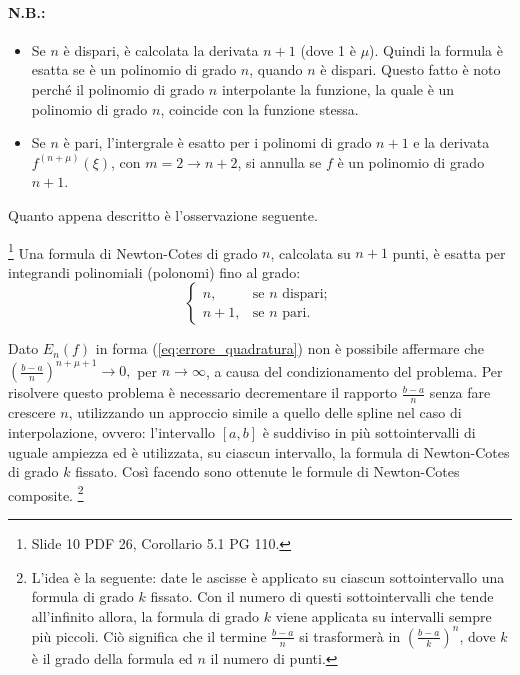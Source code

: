 

\paragraph{N.B.:}
\begin{itemize}
	\item Se $n$ è dispari, è calcolata la derivata $n+1$ (dove 1 è $\mu$). Quindi la formula è esatta se è un polinomio di grado $n$, quando $n$ è dispari. Questo fatto è noto perché il polinomio di grado $n$ interpolante la funzione, la quale è un polinomio di grado $n$, coincide con la funzione stessa.
	\item Se $n$ è pari, l'intergrale è esatto per i polinomi di grado $n+1$ e la derivata $f^{(n+\mu)}(\xi)$, con $m=2\rightarrow n+2$, si annulla se $f$ è un polinomio di grado $n+1$.
\end{itemize}
Quanto appena descritto è l'osservazione seguente.

\begin{remark}
    \footnote{Slide 10 PDF 26, Corollario 5.1 PG 110.} Una formula di Newton-Cotes di grado $n$, calcolata su $n+1$ punti, è esatta per integrandi polinomiali (polonomi) fino al grado:
    \begin{equation*}
        \begin{cases}
            n, &\text{se $n$ dispari};\\
            n+1, &\text{se $n$ pari}.
        \end{cases}
    \end{equation*}
\end{remark}

Dato $E_n(f)$ in forma (\ref{eq:errore_quadratura}) non è possibile affermare che $\left(\frac{b-a}{n}\right)^{n+\mu +1}\rightarrow 0,$ per $ n\rightarrow\infty$, a causa del condizionamento del problema. Per risolvere questo problema è necessario decrementare il rapporto $\frac{b-a}{n}$ senza fare crescere $n$, utilizzando un approccio simile a quello delle spline nel caso di interpolazione, ovvero: l'intervallo $[a,b]$ è suddiviso in più sottointervalli di uguale ampiezza ed è utilizzata, su ciascun intervallo, la formula di Newton-Cotes di grado $k$ fissato. Così facendo sono ottenute le formule di Newton-Cotes composite.
\footnote{L'idea è la seguente: date le ascisse è applicato su ciascun sottointervallo una formula di grado $k$ fissato. Con il numero di questi sottointervalli che tende all'infinito allora, la formula di grado $k$ viene applicata su intervalli sempre più piccoli. Ciò significa che il termine $\frac{b-a}{n}$ si trasformerà in $\left(\frac{b-a}{k}\right)^n$, dove $k$ è il grado della formula ed $n$ il numero di punti.}

